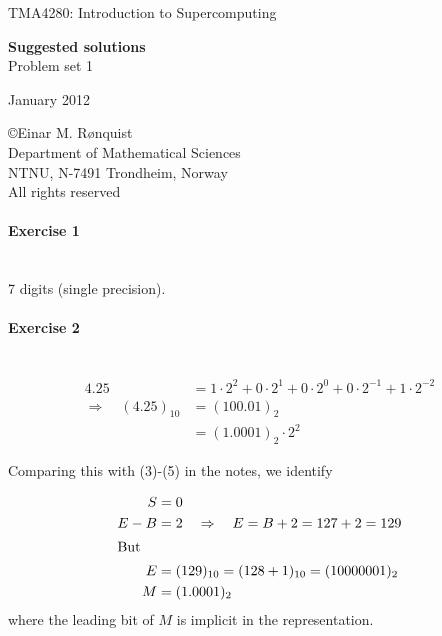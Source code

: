 \documentclass[11pt]{article}
\begin{document}
 
\LARGE
\begin{center}
TMA4280: Introduction to Supercomputing
\end{center}
\vspace{1in}

\begin{center}
{\bf Suggested solutions} \\
Problem set 1
\end{center}

\Large
\vspace{0.5in}
\begin{center}
January 2012
\end{center}

\vspace{0.5in}

\begin{center}
\copyright Einar M. R{\o}nquist \\
Department of Mathematical Sciences\\
NTNU, N-7491 Trondheim, Norway\\
All rights reserved
\end{center}

\large

\newpage

\paragraph{Exercise 1} \ \\
7 digits (single precision).

\paragraph{Exercise 2} \ \\

\begin{align*}
  4.25 &= 1 \cdot 2^2 + 0 \cdot 2^1 + 0 \cdot 2^0 + 0 \cdot 2^{-1} + 1 \cdot 2^{-2} \\
  \Rightarrow \quad (4.25)_{10} &= (100.01)_2 \\
  &= (1.0001)_2 \cdot 2^2
\end{align*}

Comparing this with (3)-(5) in the notes, we identify

\begin{align*}
  S &= 0 \\
  E-B &= 2 \quad \Rightarrow \quad E = B+2 = 127+2 = 129 \\
  \intertext{But}
  E &= (129)_{10} = (128+1)_{10} = (10000001)_2 \\
  M &= (1.0001)_2
\end{align*}
where the leading bit of $M$ is implicit in the representation.
\end{document}
